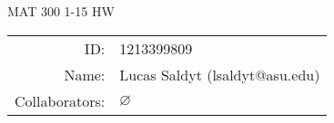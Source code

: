 \documentclass[notitlepage]{homework}
\author{Lucas Saldyt}
\title{\AssignmentName}
\newcommand{\AssignmentName}{MAT 300 1-15 HW}
\begin{document}

\begin{titlepage}
	\begin{center}
		{\Large \AssignmentName}
		
		\bigskip

		\begin{tabular}{rl}
			ID: & 1213399809 \\ %
            Name: & Lucas Saldyt (lsaldyt@asu.edu) \\ %
			Collaborators: & $\varnothing$
		\end{tabular}

		\bigskip

	\end{center}

	\toccontents

	\vfill

\end{titlepage}






% 
% 
% 
% 
% 
% 
\end{document}
